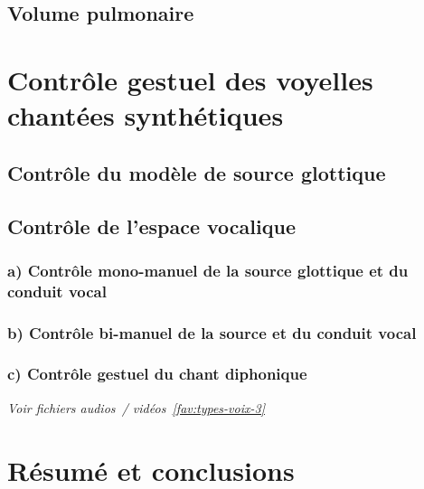 \subsection{Volume pulmonaire}


\section{Contrôle gestuel des voyelles chantées synthétiques}
\label{Sec:ctrGestVoy}
\lipsum[1-2]


\subsection{Contrôle du modèle de source glottique}
\lipsum[1-2]


\subsection{Contrôle de l'espace vocalique}
\label{Sec:ControleEspaceVocalique}


\subsubsection{a) Contrôle mono-manuel de la source glottique et du conduit vocal}
\label{Sec:ctrMonoManuel}
\lipsum[1-2]


\subsubsection{b) Contrôle bi-manuel de la source et du conduit vocal}



\subsubsection{c) Contrôle gestuel du chant diphonique}
\label{sec:cantor-chantDiphonique}
\noindent \textit{Voir fichiers audios~/ vidéos~\ref{fav:types-voix-3}}\\

\section{Résumé et conclusions}
\lipsum[1-2]
